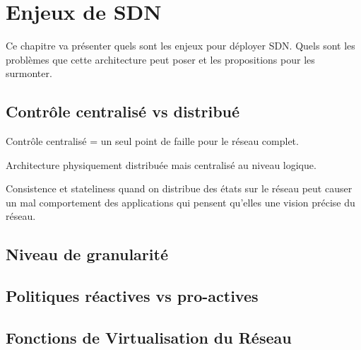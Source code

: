\chapter{Enjeux de SDN}

Ce chapitre va présenter quels sont les enjeux pour déployer SDN. Quels sont les problèmes que cette architecture peut poser et les propositions pour les surmonter.

\section{Contrôle centralisé vs distribué}
Contrôle centralisé = un seul point de faille pour le réseau complet.

Architecture physiquement distribuée mais centralisé au niveau logique.

Consistence et stateliness quand on distribue des états sur le réseau peut causer un mal comportement des applications qui pensent qu'elles une vision précise du réseau.

\section{Niveau de granularité}

\section{Politiques réactives vs pro-actives}

\section{Fonctions de Virtualisation du Réseau}

